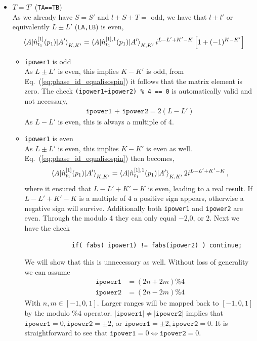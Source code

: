 \documentclass[10pt]{article}
\begin{document}
\begin{itemize}
	\item $T=T'$ (\texttt{TA==TB}) \\
		As we already have $S=S'$ and $ l + S + T = $ odd, we have that $l \pm l'$ or equivalently $L \pm L'$ (\texttt{LA,LB}) is even,
		\begin{align}
			\braket{ A | \hat{n}_{t_1}^{[1]}(p_1) | A'}_{K,K'} = \braket{ A | \hat{n}_{t_1}^{[1],1}(p_1) | A'}_{K,K'} i^{L-L'+K'-K} \left[ 1 + (-1)^{K-K'} \right]
			\label{eq:phase_id_equalisospin}
		\end{align}
		\begin{itemize}
		\item \texttt{ipower1} is odd \\
			As $L \pm L'$ is even, this implies $K-K'$ is odd, from Eq.~(\ref{eq:phase_id_equalisospin}) it follows that the matrix element is zero.
			The check \texttt{(ipower1+ipower2) \% 4 == 0} is automatically valid and not necessary,
			\begin{align}
				\texttt{ipower1 + ipower2} = 2 ( L - L')
			\end{align}
			As $L-L'$ is even, this is always a multiple of 4.
		\item \texttt{ipower1} is even \\
			As $L \pm L'$ is even, this implies $K-K'$ is even as well. Eq.~(\ref{eq:phase_id_equalisospin}) then becomes,
			\begin{align}
			\braket{ A | \hat{n}_{t_1}^{[1]}(p_1) | A'}_{K,K'} = \braket{ A | \hat{n}_{t_1}^{[1],1}(p_1) | A'}_{K,K'} 2 i^{L-L'+K'-K} \, ,
			\end{align}				
			where it ensured that $L-L'+K'-K$ is even, leading to a real result. If $L-L'+K'-K$ is a multiple of 4 a positive sign appears, otherwise a negative sign will survive.
			Additionally both \texttt{ipower1} and \texttt{ipower2} are even. Through the modulo 4 they can only equal $-2$,$0$, or $2$.
			Next we have the check
			\begin{verbatim}
			 if( fabs( ipower1) != fabs(ipower2) ) continue;
			 \end{verbatim}
			 We will show that this is unnecessary as well. Without loss of generality we can assume
			 \begin{align*}
			 	\texttt{ipower1} &= (2n + 2m) \% 4 \\
			 	\texttt{ipower2} &= (2n - 2m) \% 4
			 \end{align*}
			 With $n,m \in [-1,0,1]$. Larger ranges will be mapped back to $[-1,0,1]$ by the modulo \%4 operator. $|\texttt{ipower1}| \neq |\texttt{ipower2}|$ implies that $\texttt{ipower1} = 0, \texttt{ipower2} = \pm 2$, or $\texttt{ipower1} = \pm 2, \texttt{ipower2} = 0$. It is straightforward to see that $\texttt{ipower1} = 0 \Leftrightarrow \texttt{ipower2} = 0$.

\end{itemize}
\end{itemize}
\end{document}
